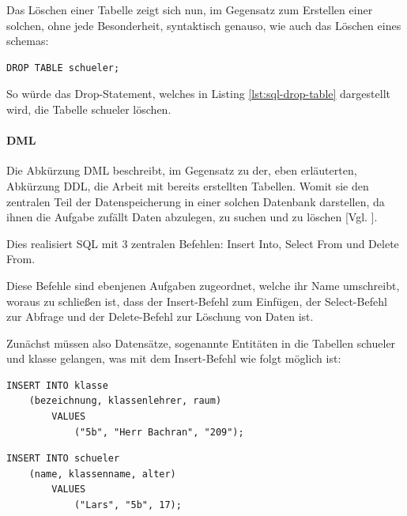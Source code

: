 \documentclass[12pt,a4paper,bibliography=totocnumbered,listof=totocnumbered]{scrartcl}
\begin{document}
Das Löschen einer Tabelle zeigt sich nun, im Gegensatz zum Erstellen einer solchen, ohne jede Besonderheit, syntaktisch genauso, wie auch das Löschen eines \glqq schemas\grqq{}:
\\
\vspace{1em}
\begin{lstlisting}[caption= SQL Drop Table, label=lst:sql-drop-table]
DROP TABLE schueler;
\end{lstlisting}
So würde das \glqq Drop-Statement\grqq{}, welches in Listing \ref{lst:sql-drop-table} dargestellt wird, die Tabelle \glqq schueler\grqq{} löschen.

\paragraph{DML}

Die Abkürzung DML beschreibt, im Gegensatz zu der, eben erläuterten, Abkürzung DDL, die Arbeit mit bereits erstellten Tabellen.
Womit sie den zentralen Teil der Datenspeicherung in einer solchen Datenbank darstellen, da ihnen die Aufgabe zufällt Daten abzulegen, zu suchen und zu löschen [Vgl. \cite{wiki/SQL}].

Dies realisiert SQL mit 3 zentralen Befehlen:
\glqq Insert Into\grqq, \glqq Select From\grqq{} und \glqq Delete From\grqq.

Diese Befehle sind ebenjenen Aufgaben zugeordnet, welche ihr Name umschreibt, woraus zu schließen ist, dass der \glqq Insert-Befehl\grqq{} zum Einfügen, der \glqq Select-Befehl\grqq{} zur Abfrage und der \glqq Delete-Befehl\grqq{} zur Löschung von Daten ist.

Zunächst müssen also Datensätze, sogenannte \glqq Entitäten\grqq{} in die Tabellen \glqq schueler\grqq{} und \glqq klasse\grqq{} gelangen, was mit dem \glqq Insert-Befehl\grqq{} wie folgt möglich ist:
\\
\vspace{1em}
\begin{lstlisting}[caption= SQL Insert Into Table, label=lst:sql-insert-into-table]
INSERT INTO klasse
	(bezeichnung, klassenlehrer, raum)
		VALUES
			("5b", "Herr Bachran", "209");
\end{lstlisting}
 


\vspace{1em}
\begin{lstlisting}[caption= SQL Insert Into Table 2, label=lst:sql-insert-into-table2]
INSERT INTO schueler
	(name, klassenname, alter)
		VALUES
			("Lars", "5b", 17);
\end{lstlisting}
 
\end{document}
